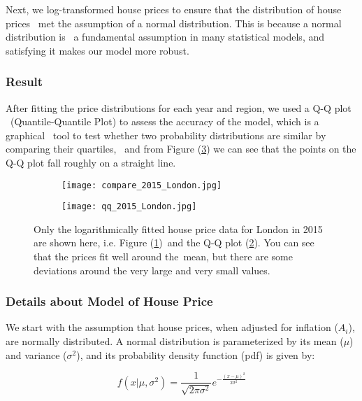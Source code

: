 \documentclass[12pt]{article}  %
\begin{document}
Next, we log-transformed house prices to ensure that the distribution of house prices \
met the assumption of a normal distribution. This is because a normal distribution is \
a fundamental assumption in many statistical models, and satisfying it makes our model more robust.
\subsubsection{Result}
After fitting the price distributions for each year and region, we used a Q-Q plot \
(Quantile-Quantile Plot) to assess the accuracy of the model, which is a graphical \
tool to test whether two probability distributions are similar by comparing their quartiles, \
and from Figure (\ref{fig:qq}) we can see that the points on the Q-Q plot fall roughly on a straight line.

\begin{figure}[htbp]
    \centering
    \begin{subfigure}[b]{.5\textwidth}
        \texttt{[image: compare\_2015\_London.jpg]}
        \caption{}\label{subfig:hist}
    \end{subfigure}
    \begin{subfigure}[b]{.4\textwidth}
        \texttt{[image: qq\_2015\_London.jpg]}
        \caption{}\label{subfig:qq}
    \end{subfigure}
    \caption{Only the logarithmically fitted house price data for London in 2015 are shown here, i.e. Figure (\ref{subfig:hist})\
    and the Q-Q plot (\ref{subfig:qq}). You can see that the prices fit well around the\
    mean, but there are some deviations around the very large and very small values.
    }\label{fig:qq}
\end{figure}

\subsubsection{Details about Model of House Price}
We start with the assumption that house prices, when adjusted for inflation ($A_i$), are normally distributed. A normal distribution is parameterized by its mean ($\mu$) and variance ($\sigma^2$), and its probability density function (pdf) is given by\textsuperscript{\cite{lognorm}}:

\begin{equation}
f(x|\mu, \sigma^2)=\frac{1}{\sqrt{2\pi\sigma^2}} e^{-\frac{(x-\mu)^2}{2\sigma^2}}
\end{equation}
\end{document}

